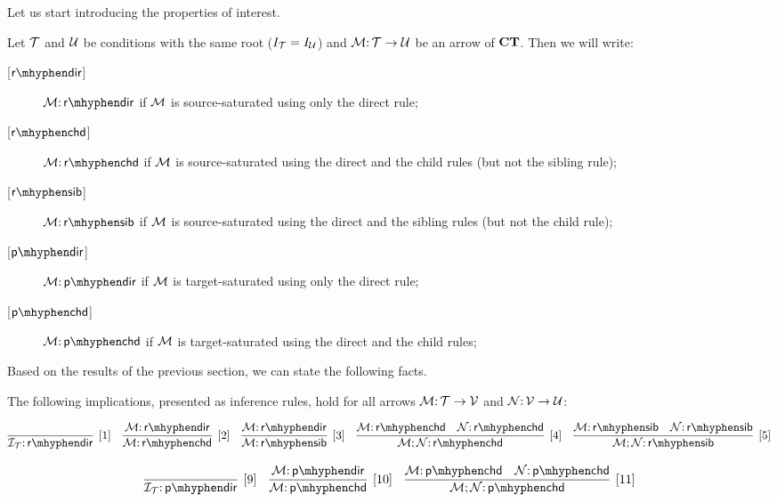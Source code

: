 Let us start introducing the properties of interest.

\begin{definition}
\label{def:properties}
\end{definition}
Let ${\mathcal{T}}$ and ${\mathcal{U}}$ be conditions with the same root ($I_{\mathcal{T}}=I_{\mathcal{U}}$) and ${\mathcal{M}} {:}\, {\mathcal{T}} \rightarrow {\mathcal{U}}$ be an arrow of $\mathbf{CT}$. Then we will write:

\begin{description}
    \item[{[$\rdir$]}] $\cM \of \rdir$ if ${\mathcal{M}}$ is source-saturated using only the  direct rule;
    \item [{[$\rchd$]}] $\cM \of \rchd$ if ${\mathcal{M}}$ is source-saturated using the  direct and the child rules (but not the sibling rule);
    \item  [{[$\rsib$]}] $\cM \of \rsib$ if ${\mathcal{M}}$ is source-saturated using the  direct and the sibling rules (but not the child rule);
    \item [{[$\pdir$]}] $\cM \of \pdir$ if ${\mathcal{M}}$ is target-saturated using only the  direct rule;
    \item [{[$\pchd$]}] $\cM \of \pchd$ if ${\mathcal{M}}$ is target-saturated using the  direct and the child rules;
\end{description}

Based on the results of the previous section, we can state the following facts.

\begin{proposition}
The following implications, presented as inference rules, hold for all arrows ${\mathcal{M}} {:}\,{\mathcal{T}} \rightarrow {\mathcal{V}}$ and ${\mathcal{N}}{:}\, {\mathcal{V}} \rightarrow {\mathcal{U}}$: 

$$\infer[{[1]}]{\cI_\cT \of \rdir}{} \quad \infer[{[2]}]{\cM\of \rchd}{\cM\of \rdir} \quad \infer[{[3]}]{\cM\of \rsib}{\cM\of \rdir} \quad \infer[{[4]}]{\cM;\cN\of \rchd}{\cM\of \rchd & \cN \of \rchd}  \quad \infer[{[5]}]{\cM;\cN\of \rsib}{\cM\of \rsib & \cN \of \rsib} $$


$$\infer[{[9]}]{\cI_\cT \of \pdir}{} \quad \infer[{[10]}]{\cM\of \pchd}{\cM\of \pdir} \quad 
\infer[{[11]}]{\cM;\cN\of \pchd}{\cM\of \pchd & \cN \of \pchd}  $$
\end{proposition} 

